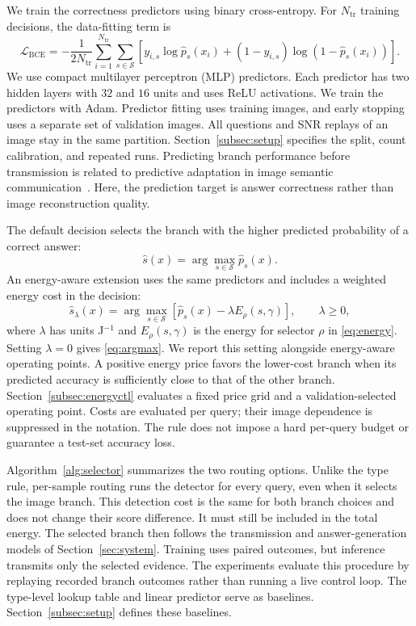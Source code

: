 We train the correctness predictors using binary cross-entropy.
For $N_{\mathrm{tr}}$ training decisions, the data-fitting term is
\begin{equation}
\mathcal L_{\mathrm{BCE}}
=-\frac{1}{2N_{\mathrm{tr}}}
\sum_{i=1}^{N_{\mathrm{tr}}}\sum_{s\in\mathcal S}
\left[y_{i,s}\log\widehat p_s(x_i)
+(1-y_{i,s})\log(1-\widehat p_s(x_i))\right].
\label{eq:router-loss}
\end{equation}
We use compact multilayer perceptron (MLP) predictors.
Each predictor has two hidden layers with $32$ and $16$ units and
uses ReLU activations. We train the predictors with Adam.
Predictor fitting uses training images, and early stopping uses a
separate set of validation images. All questions and SNR replays of
an image stay in the same partition. Section~\ref{subsec:setup}
specifies the split, count calibration, and repeated runs.
Predicting branch performance before transmission is related to
predictive adaptation in image semantic communication~\cite{zhang2023padc}.
Here, the prediction target is answer correctness rather than image
reconstruction quality.

The default decision selects the branch with the higher predicted
probability of a correct answer:
\begin{equation}
\widehat s(x)=\arg\max_{s\in\mathcal S}\widehat p_s(x).
\label{eq:argmax}
\end{equation}
An energy-aware extension uses the same predictors and includes a
weighted energy cost in the decision:
\begin{equation}
\widehat s_\lambda(x)=
\arg\max_{s\in\mathcal S}
\left[\widehat p_s(x)-\lambda E_\rho(s,\gamma)\right],
\qquad \lambda\ge0,
\label{eq:argmax-lambda}
\end{equation}
where $\lambda$ has units J$^{-1}$ and $E_\rho(s,\gamma)$ is the
energy for selector $\rho$ in \eqref{eq:energy}. Setting $\lambda=0$
gives \eqref{eq:argmax}. We report this setting alongside
energy-aware operating points. A positive energy price favors the lower-cost branch when
its predicted accuracy is sufficiently close to that of the other
branch. Section~\ref{subsec:energyctl} evaluates a fixed price grid
and a validation-selected operating point. Costs are evaluated
per query; their image dependence is suppressed in the notation.
The rule does not impose a hard per-query budget or guarantee
a test-set accuracy loss.

Algorithm~\ref{alg:selector} summarizes the two routing options.
Unlike the type rule, per-sample routing runs the detector for every
query, even when it selects the image branch. This detection cost is
the same for both branch choices and does not change their score
difference. It must still be included in the total energy.
The selected branch then follows the transmission and
answer-generation models of Section~\ref{sec:system}. Training uses
paired outcomes, but inference transmits only the selected evidence.
The experiments evaluate this procedure by replaying recorded branch
outcomes rather than running a live control loop. The type-level
lookup table and linear predictor serve as baselines.
Section~\ref{subsec:setup} defines these baselines.

